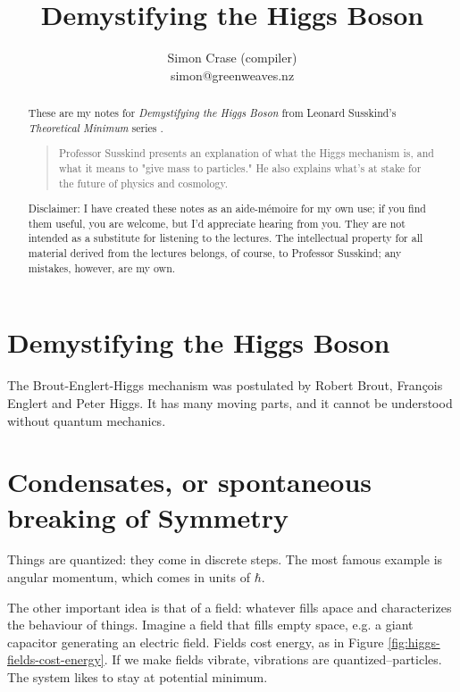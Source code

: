 \documentclass[]{article}
\title{Demystifying the Higgs Boson}
\author{Simon Crase (compiler)\\simon@greenweaves.nz}
\begin{document}
\maketitle

\begin{abstract}
These are my notes for \emph{Demystifying the Higgs Boson}  from Leonard Susskind's \emph{Theoretical Minimum} series \cite[Demystifying the Higgs Boson]{susskind2007theoretical}.

\begin{quotation}
	Professor Susskind presents an explanation of what the Higgs mechanism is, and what it means to "give mass to particles." He also explains what's at stake for the future of physics and cosmology.
\end{quotation}

Disclaimer: I have created these notes as an aide-m\'emoire for my own use; if you find them useful, you are welcome, but I'd appreciate hearing from you. They are not intended as a substitute for listening to the lectures. The intellectual property for all material derived from the lectures belongs, of course, to Professor Susskind; any mistakes, however, are my own.


\end{abstract}

\tableofcontents
\listoffigures
\listoftables
\listoftheorems

\section{Demystifying the Higgs Boson}

The  Brout-Englert-Higgs mechanism was postulated by Robert Brout, Fran\c{c}ois Englert and Peter Higgs. It has many moving parts, and it cannot be understood without quantum mechanics.

\section{Condensates, or spontaneous breaking of Symmetry}

Things are quantized: they come in discrete steps. The most famous example is angular momentum, which comes in units of $\hbar$.

The other important idea is that of a field: whatever fills apace and characterizes the behaviour of things. Imagine a field that fills empty space, e.g. a giant capacitor generating an electric field. Fields cost energy, as in Figure \ref{fig:higgs-fields-cost-energy}. If we make fields vibrate, vibrations are quantized--particles. The system likes to stay at potential minimum.
\end{document}
